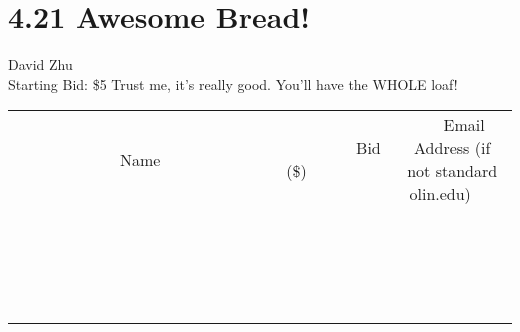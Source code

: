 \documentclass[11pt]{article}
\begin{document}
\section*{4.21 Awesome Bread!}
David Zhu
\\
Starting Bid: \$5
\newline
Trust me, it's really good. You'll have the WHOLE loaf!
\\[3ex]
\begin{tabular}{c c c}
~~~~~~~~~~~~~Name~~~~~~~~~~~~~ & ~~~~~~~~~Bid (\$)~~~~~~~~~  & ~~~Email Address (if not standard olin.edu)~~~\\
 & & \\
\hline
 & & \\
\hline
 & & \\
\hline
 & & \\
\hline
 & & \\
\hline
 & & \\
\hline
 & & \\
\hline
 & & \\
\hline
 & & \\
\hline
 & & \\
\hline
 & & \\
\hline
 & & \\
\hline
 & & \\
\hline
 & & \\
\hline
 & & \\
\hline
 & & \\
\hline
 & & \\
\hline
 & & \\
\hline
 & & \\
\hline
\end{tabular}
\newpage
\end{document}
